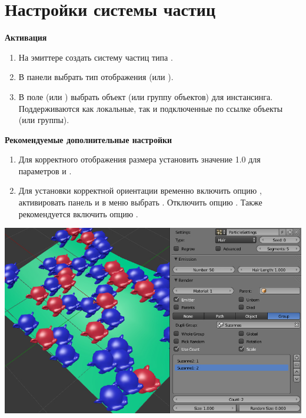 \documentclass[a4paper,12pt,oneside]{sphinxmanual}
\begin{document}
\section{Настройки системы частиц}
\label{particles_instancing:id2}
\textbf{Активация}
\begin{enumerate}
\item {} 
На эмиттере создать систему частиц типа .

\item {} 
В панели  выбрать тип отображения  (или ).

\item {} 
В поле  (или ) выбрать объект (или группу объектов) для инстансинга. Поддерживаются как локальные, так и подключенные по ссылке объекты (или группы).

\end{enumerate}

\textbf{Рекомендуемые дополнительные настройки}
\begin{enumerate}
\item {} 
Для корректного отображения размера установить значение 1.0 для параметров  и .

\item {} 
Для установки корректной ориентации временно включить опцию , активировать панель  и в меню  выбрать . Отключить опцию . Также рекомендуется включить опцию .

\end{enumerate}

{\hfill\includegraphics[width=1.000\linewidth]{particles_instancing_setup.jpg}\hfill}
\end{document}
